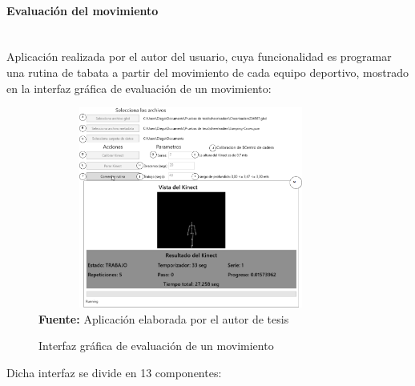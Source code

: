 \paragraph{Evaluaci\'on del movimiento}\mbox{} \\\label{ins:UI:wpf:evaluate}
Aplicaci\'on realizada por el autor del usuario, cuya funcionalidad es programar una rutina de tabata a partir del movimiento de cada equipo deportivo, mostrado en la interfaz gr\'afica de evaluaci\'on de un movimiento:
\begin{figure}[H]
	\caption{Interfaz gr\'afica de evaluaci\'on de un movimiento}
	\label{fig:appEvaluate}
	\centering
	\includegraphics[width=380px,height=250px]{graphics/appEvaluacion.png} \\
	\textbf{Fuente:} Aplicaci\'on elaborada por el autor de tesis
\end{figure}
Dicha interfaz se divide en 13 componentes:
